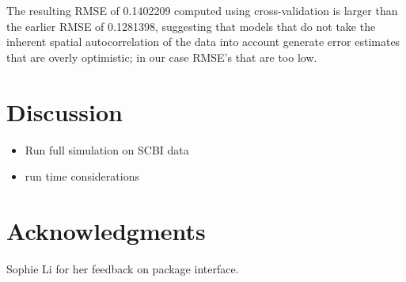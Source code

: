 \documentclass[12pt]{article}
\providecommand{\tightlist}{%
  \setlength{\itemsep}{0pt}\setlength{\parskip}{0pt}}
\begin{document}
The resulting RMSE of 0.1402209 computed using cross-validation is
larger than the earlier RMSE of 0.1281398, suggesting that models that
do not take the inherent spatial autocorrelation of the data into
account generate error estimates that are overly optimistic; in our case
RMSE's that are too low.

\hypertarget{discussion}{%
\section{Discussion}\label{discussion}}

\begin{itemize}
\tightlist
\item
  Run full simulation on SCBI data
\item
  run time considerations
\end{itemize}

\hypertarget{acknowledgments}{%
\section{Acknowledgments}\label{acknowledgments}}

Sophie Li for her feedback on package interface.



\end{document}
